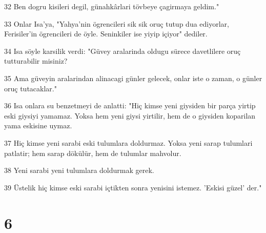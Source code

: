 \par 32 Ben dogru kisileri degil, günahkârlari tövbeye çagirmaya geldim."
\par 33 Onlar Isa'ya, "Yahya'nin ögrencileri sik sik oruç tutup dua ediyorlar, Ferisiler'in ögrencileri de öyle. Seninkiler ise yiyip içiyor" dediler.
\par 34 Isa söyle karsilik verdi: "Güvey aralarinda oldugu sürece davetlilere oruç tutturabilir misiniz?
\par 35 Ama güveyin aralarindan alinacagi günler gelecek, onlar iste o zaman, o günler oruç tutacaklar."
\par 36 Isa onlara su benzetmeyi de anlatti: "Hiç kimse yeni giysiden bir parça yirtip eski giysiyi yamamaz. Yoksa hem yeni giysi yirtilir, hem de o giysiden koparilan yama eskisine uymaz.
\par 37 Hiç kimse yeni sarabi eski tulumlara doldurmaz. Yoksa yeni sarap tulumlari patlatir; hem sarap dökülür, hem de tulumlar mahvolur.
\par 38 Yeni sarabi yeni tulumlara doldurmak gerek.
\par 39 Üstelik hiç kimse eski sarabi içtikten sonra yenisini istemez. 'Eskisi güzel' der."

\chapter{6}

